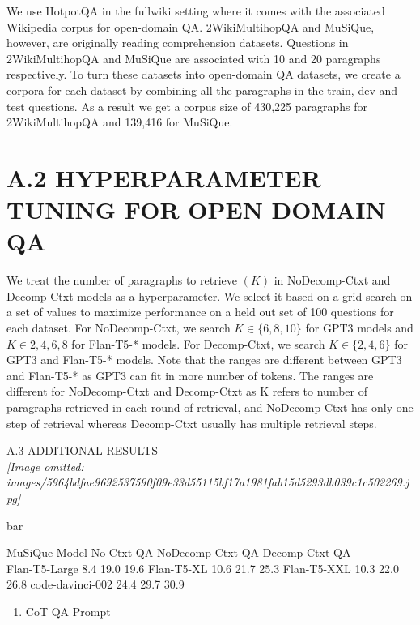\documentclass[
]{article}
\providecommand{\tightlist}{%
  \setlength{\itemsep}{0pt}\setlength{\parskip}{0pt}}
\begin{document}
We use HotpotQA in the fullwiki setting where it comes with the
associated Wikipedia corpus for open-domain QA. 2WikiMultihopQA and
MuSiQue, however, are originally reading comprehension datasets.
Questions in 2WikiMultihopQA and MuSiQue are associated with 10 and 20
paragraphs respectively. To turn these datasets into open-domain QA
datasets, we create a corpora for each dataset by combining all the
paragraphs in the train, dev and test questions. As a result we get a
corpus size of 430,225 paragraphs for 2WikiMultihopQA and 139,416 for
MuSiQue.

\section{A.2 HYPERPARAMETER TUNING FOR OPEN DOMAIN
QA}\label{a.2-hyperparameter-tuning-for-open-domain-qa}

We treat the number of paragraphs to retrieve \((K)\) in NoDecomp-Ctxt
and Decomp-Ctxt models as a hyperparameter. We select it based on a grid
search on a set of values to maximize performance on a held out set of
100 questions for each dataset. For NoDecomp-Ctxt, we search
\(K \in \{6, 8, 10\}\) for GPT3 models and \(K \in 2, 4, 6, 8\) for
Flan-T5-* models. For Decomp-Ctxt, we search \(K \in \{2, 4, 6\}\) for
GPT3 and Flan-T5-* models. Note that the ranges are different between
GPT3 and Flan-T5-* as GPT3 can fit in more number of tokens. The ranges
are different for NoDecomp-Ctxt and Decomp-Ctxt as K refers to number of
paragraphs retrieved in each round of retrieval, and NoDecomp-Ctxt has
only one step of retrieval whereas Decomp-Ctxt usually has multiple
retrieval steps.

A.3 ADDITIONAL RESULTS\\
\textit{[Image omitted: images/5964bdfae9692537590f09e33d55115bf17a1981fab15d5293db039c1c502269.jpg]}

bar

MuSiQue \textbar{} Model \textbar{} No-Ctxt QA \textbar{} NoDecomp-Ctxt
QA \textbar{} Decomp-Ctxt QA \textbar{}
\textbar---\textbar---\textbar---\textbar---\textbar{} \textbar{}
Flan-T5-Large \textbar{} 8.4 \textbar{} 19.0 \textbar{} 19.6 \textbar{}
\textbar{} Flan-T5-XL \textbar{} 10.6 \textbar{} 21.7 \textbar{} 25.3
\textbar{} \textbar{} Flan-T5-XXL \textbar{} 10.3 \textbar{} 22.0
\textbar{} 26.8 \textbar{} \textbar{} code-davinci-002 \textbar{} 24.4
\textbar{} 29.7 \textbar{} 30.9 \textbar{}

\begin{enumerate}
\def\labelenumi{(\alph{enumi})}
\tightlist
\item
  CoT QA Prompt
\end{enumerate}
\end{document}
